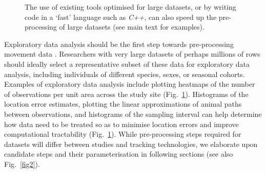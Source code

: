 \begin{refsection}
\begin{figure}
{{            The use of existing tools optimised for large datasets, or by writing code in a `fast' language such as \textit{C++}, can also speed up the pre-processing of large datasets (see main text for examples).
        }
        }
        \label{fig1}
    \end{figure}

    Exploratory data analysis should be the first step towards pre-processing movement data \cite[see Fig.~\ref{fig1};][]{slingsby2016}.
    Researchers with very large datasets of perhaps millions of rows should ideally select a representative subset of these data for exploratory data analysis, including individuals of different species, sexes, or seasonal cohorts.
    Examples of exploratory data analysis include plotting heatmaps of the number of observations per unit area across the study site (Fig.~\ref{fig1}).
    Histograms of the location error estimates, plotting the linear approximations of animal paths between observations, and histograms of the sampling interval can help determine how data need to be treated so as to minimise location errors and improve computational tractability (Fig.~\ref{fig1}).
    While pre-processing steps required for datasets will differ between studies and tracking technologies, we elaborate upon candidate steps and their parameterisation in following sections (see also Fig.~\ref{fig2}).


\end{refsection}
